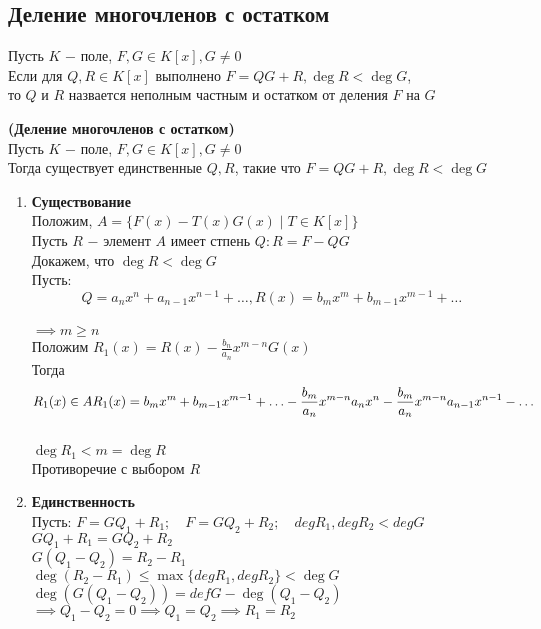 \subsection{Деление многочленов с остатком}
\begin{definition}
	Пусть $K$ $-$ поле, $F,G \in K[x], G\neq 0$ \\
	Если для $Q,R \in K[x]$ выполнено $F=QG+R, \deg R < \deg G$,\\
	то $Q$ и $R$ назвается неполным частным и остатком от деления $F$ на $G$
\end{definition}
\begin{theorem}
	\textbf{(Деление многочленов с остатком)}\\
	Пусть $K$ $-$ поле, $F,G \in K[x], G\neq 0$ \\
	Тогда существует единственные $Q,R$, такие что  $F=QG+R, \deg R<\deg G$
\end{theorem}
\begin{replacementproof}
	\begin{enumerate}
		\item \textbf{Существование}\\
			Положим, $A = \{F(x)-T(x)G(x)\mid T \in K[x]\}$\\
			Пусть $R$ $-$ элемент $A$ имеет стпень $Q: R=F-QG$ \\
			Докажем, что $\deg R<\deg G$\\
			Пусть:  $$Q=a_nx^{n}+a_{n-1}x^{n-1}+\ldots, R(x)=b_mx^{m}+b_{m-1}x^{m-1}+\ldots$$ \\
			$\implies m \ge n$\\
			Положим $R_1(x)=R(x)-\displaystyle\frac{b_n}{a_n}x^{m-n}G(x)$ \\
			Тогда $$R_1(x) \in A\\ R_1(x) = b_mx^{m}+b_{m-1}x^{m-1}+\ldots-\displaystyle\frac{b_m}{a_n}x^{m-n}a_nx^{n}-\displaystyle\frac{b_m}{a_n}x^{m-n}a_{n-1}x^{n-1}-\ldots$$ \\
			$\deg R_1<m=\deg R$\\
			Противоречие с выбором $R$
		\item \textbf{Единственность}\\
			Пусть: $F=GQ_1+R_1; \quad F=GQ_2+R_2; \quad degR_1,degR_2<degG$\\
			$GQ_1+R_1=GQ_2+R_2$\\
			$G(Q_1-Q_2)=R_2-R_1$ \\
			$\deg (R_2-R_1)\le \max\{degR_1,degR_2\} < \deg G $ \\$\deg (G(Q_1-Q_2))=defG-\deg (Q_1-Q_2)$ \\
			$\implies Q_1-Q_2=0 \implies Q_1=Q_2 \implies R_1=R_2$
	\end{enumerate}
\end{replacementproof}
